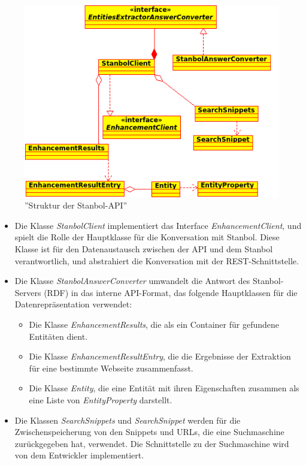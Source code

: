 \begin{figure}[ht]
\centering
\includegraphics[width=\textwidth]{Bilder/apiuml.png}
\caption{''Struktur der Stanbol-API''}
\label{fig:apiuml}
\end{figure}
\begin{itemize}
\item Die Klasse \textit{StanbolClient} implementiert das Interface \textit{EnhancementClient}, und spielt die Rolle der Hauptklasse für die Konversation mit Stanbol. Diese Klasse ist für den Datenaustausch zwischen der API und dem Stanbol verantwortlich, und abstrahiert die Konversation mit der REST-Schnittstelle.
\item Die Klasse \textit{StanbolAnswerConverter} umwandelt die Antwort des Stanbol-Servers (RDF) in das interne API-Format, das folgende Hauptklassen für die Datenrepräsentation verwendet:
\begin{itemize}
\item Die Klasse \textit{EnhancementResults}, die als ein Container für gefundene Entitäten dient.
\item Die Klasse \textit{EnhancementResultEntry}, die die Ergebnisse der Extraktion für eine bestimmte Webseite zusammenfasst.
\item Die Klasse \textit{Entity}, die eine Entität mit ihren Eigenschaften zusammen als eine Liste von \textit{EntityProperty} darstellt.
\end{itemize}
\item Die Klassen \textit{SearchSnippets} und \textit{SearchSnippet} werden für die Zwischenspeicherung von den Snippets und URLs, die eine Suchmaschine zurückgegeben hat, verwendet. Die Schnittstelle zu der Suchmaschine wird von dem Entwickler implementiert.
\end{itemize}